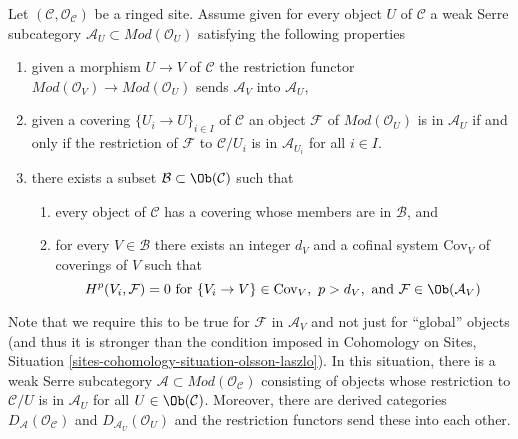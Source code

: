 \medskip\noindent
Let $(\mathcal{C}, \mathcal{O}_\mathcal{C})$ be a ringed site.
Assume given for every object $U$ of $\mathcal{C}$
a weak Serre subcategory $\mathcal{A}_U \subset \textit{Mod}(\mathcal{O}_U)$
satisfying the following properties
\begin{enumerate}
\item
\label{item-restriction}
given a morphism $U \to V$ of $\mathcal{C}$ the restriction
functor $\textit{Mod}(\mathcal{O}_V) \to \textit{Mod}(\mathcal{O}_U)$
sends $\mathcal{A}_V$ into $\mathcal{A}_U$,
\item
\label{item-local}
given a covering $\{U_i \to U\}_{i \in I}$ of $\mathcal{C}$
an object $\mathcal{F}$ of $\textit{Mod}(\mathcal{O}_U)$
is in $\mathcal{A}_U$ if and only if the restriction of
$\mathcal{F}$ to $\mathcal{C}/U_i$ is in $\mathcal{A}_{U_i}$
for all $i \in I$.
\item
\label{item-bounded-dimension}
there exists a subset $\mathcal{B} \subset \Ob(\mathcal{C})$
such that
\begin{enumerate}
\item every object of $\mathcal{C}$ has a covering whose
members are in $\mathcal{B}$, and
\item for every $V \in \mathcal{B}$ there exists an integer $d_V$
and a cofinal system $\text{Cov}_V$ of coverings of $V$ such
that
$$
H^p(V_i, \mathcal{F}) = 0 \text{ for }
\{V_i \to V\} \in \text{Cov}_V,\ p > d_V, \text{ and }
\mathcal{F} \in \Ob(\mathcal{A}_V)
$$
\end{enumerate}
\end{enumerate}
Note that we require this to be true for $\mathcal{F}$ in
$\mathcal{A}_V$ and not just for ``global'' objects
(and thus it is stronger than the condition imposed in
Cohomology on Sites, Situation \ref{sites-cohomology-situation-olsson-laszlo}).
In this situation, there is a weak Serre subcategory
$\mathcal{A} \subset \textit{Mod}(\mathcal{O}_\mathcal{C})$
consisting of objects whose restriction to $\mathcal{C}/U$
is in $\mathcal{A}_U$ for all $U \in \Ob(\mathcal{C})$.
Moreover, there are derived categories
$D_\mathcal{A}(\mathcal{O}_\mathcal{C})$ and
$D_{\mathcal{A}_U}(\mathcal{O}_U)$ and the restriction
functors send these into each other.

